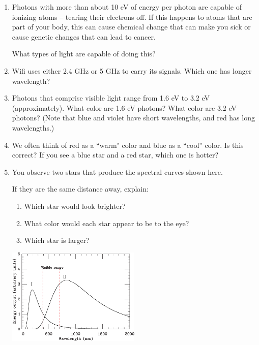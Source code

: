 \documentclass[12pt]{article}
\begin{document}
\begin{enumerate}
	\item Photons with more than about 10 eV of energy per photon are capable of ionizing atoms -- tearing their electrons off. If this happens to atoms that are part of your body, this can cause chemical change that can make you sick or cause genetic changes that can lead to cancer.
	
	What types of light are capable of doing this?
	
	\item Wifi uses either 2.4 GHz or 5 GHz to carry its signals. Which one has longer wavelength?
	
	\item Photons that comprise visible light range from 1.6 eV to 3.2 eV (approximately). What color are 1.6 eV photons? What color are 3.2 eV photons? (Note that blue and violet have short wavelengths, and red has long wavelengths.)
	
	\item We often think of red as a ``warm" color and blue as a ``cool'' color. Is this correct? If you see a blue star and a red star, which one is hotter?
	
	\item You observe two stars that produce the spectral curves shown here.
	
	\begin{minipage}{0.5\textwidth}If they are the same distance away, explain:
		
	\begin{enumerate}
	\item Which star would look brighter?
	\item What color would each star appear to be to the eye?
	\item Which star is larger?
	\end{enumerate}
	\end{minipage}
\hspace{0.05\textwidth}
	\begin{minipage}{0.4\textwidth}
	\includegraphics[width=2.5in]{twostars-crop.pdf}
	\end{minipage}


\end{enumerate}
\end{document}
